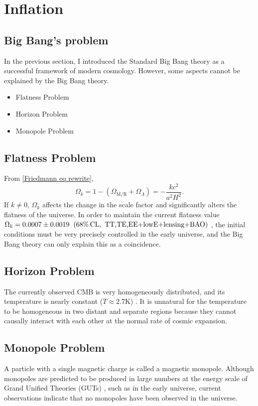 \documentclass[12pt]{article}
\newcommand{\tcb}[2]{\begin{tcolorbox}[title={\textcolor{white}{#1}}, opacitybacktitle = 0, colframe=white!40!black]#2
\end{tcolorbox}}
\numberwithin{equation}{section}
\begin{document}
\section{Inflation}
\subsection{Big Bang's problem}
In the previous section, I introduced the Standard Big Bang theory as a successful framework of modern cosmology. However, some aspects cannot be explained by the Big Bang theory.
\tcb{Problems of the Big Bang Model}{
    \begin{itemize}
        \item Flatness Problem
        \item Horizon Problem
        \item Monopole Problem
    \end{itemize}
}

\subsection*{Flatness Problem}
From \eqref{Friedmann eq rewrite},
\begin{equation}
    \Omega_k = 1 - (\Omega_{\textrm{M/R}} + \Omega_{\Lambda}) = -\frac{kc^2}{a^2 H^2}.
\end{equation}
If $k \neq 0$, $\Omega_k$ affects the change in the scale factor and significantly alters the flatness of the universe. In order to maintain the current flatness value $\Omega_k = 0.0007 \pm 0.0019\hspace{0.2cm}(68\%\,\textrm{CL,\, TT,TE,EE+lowE+lensing+BAO})$ \cite{Planck:2018vyg}, the initial conditions must be very precisely controlled in the early universe, and the Big Bang theory can only explain this as a coincidence.

\subsection*{Horizon Problem}
The currently observed CMB is very homogeneously distributed, and its temperature is nearly constant ($T \approx 2.7 \textrm{K}$) \cite{Planck:2018vyg}\cite{BICEP:2021xfz}. It is unnatural for the temperature to be homogeneous in two distant and separate regions because they cannot causally interact with each other at the normal rate of cosmic expansion.

\subsection*{Monopole Problem}
A particle with a single magnetic charge is called a magnetic monopole. Although monopoles are predicted to be produced in large numbers at the energy scale of Grand Unified Theories (GUTs) \cite{tHooft:1974kcl}, such as in the early universe, current observations indicate that no monopoles have been observed in the universe.
\end{document}
